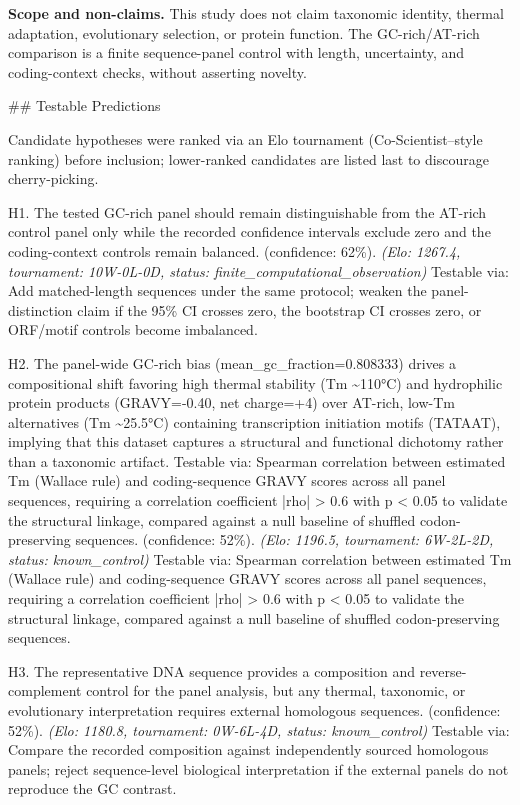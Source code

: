 \documentclass[11pt,a4paper]{article}
\begin{document}
\textbf{Scope and non-claims.} This study does not claim taxonomic identity, thermal adaptation, evolutionary selection, or protein function. The GC-rich/AT-rich comparison is a finite sequence-panel control with length, uncertainty, and coding-context checks, without asserting novelty.

\#\# Testable Predictions

Candidate hypotheses were ranked via an Elo tournament (Co-Scientist–style ranking) before inclusion; lower-ranked candidates are listed last to discourage cherry-picking.

H1. The tested GC-rich panel should remain distinguishable from the AT-rich control panel only while the recorded confidence intervals exclude zero and the coding-context controls remain balanced. (confidence: 62\%). \textit{(Elo: 1267.4, tournament: 10W-0L-0D, status: finite\_computational\_observation)} Testable via: Add matched-length sequences under the same protocol; weaken the panel-distinction claim if the 95\% CI crosses zero, the bootstrap CI crosses zero, or ORF/motif controls become imbalanced.

H2. The panel-wide GC-rich bias (mean\_gc\_fraction=0.808333) drives a compositional shift favoring high thermal stability (Tm \textasciitilde{}110°C) and hydrophilic protein products (GRAVY=-0.40, net charge=+4) over AT-rich, low-Tm alternatives (Tm \textasciitilde{}25.5°C) containing transcription initiation motifs (TATAAT), implying that this dataset captures a structural and functional dichotomy rather than a taxonomic artifact. Testable via: Spearman correlation between estimated Tm (Wallace rule) and coding-sequence GRAVY scores across all panel sequences, requiring a correlation coefficient |rho| > 0.6 with p < 0.05 to validate the structural linkage, compared against a null baseline of shuffled codon-preserving sequences. (confidence: 52\%). \textit{(Elo: 1196.5, tournament: 6W-2L-2D, status: known\_control)} Testable via: Spearman correlation between estimated Tm (Wallace rule) and coding-sequence GRAVY scores across all panel sequences, requiring a correlation coefficient |rho| > 0.6 with p < 0.05 to validate the structural linkage, compared against a null baseline of shuffled codon-preserving sequences.

H3. The representative DNA sequence provides a composition and reverse-complement control for the panel analysis, but any thermal, taxonomic, or evolutionary interpretation requires external homologous sequences. (confidence: 52\%). \textit{(Elo: 1180.8, tournament: 0W-6L-4D, status: known\_control)} Testable via: Compare the recorded composition against independently sourced homologous panels; reject sequence-level biological interpretation if the external panels do not reproduce the GC contrast.
\end{document}
